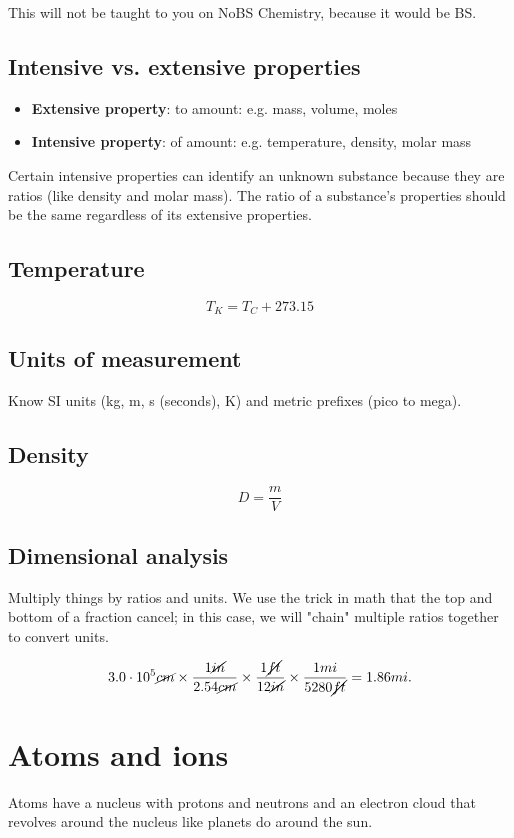 \documentclass[letterpaper, 12pt]{article}
\begin{document}
This will not be taught to you on NoBS Chemistry, because it would be BS.

	\subsection{Intensive vs. extensive properties}
	\begin{itemize}
		\item \textbf{Extensive property}:  to amount: e.g. mass, volume, moles
		\item \textbf{Intensive property}:  of amount: e.g. temperature, density, molar mass
	\end{itemize}

	Certain intensive properties can identify an unknown substance because they are ratios (like density and molar mass). The ratio of a substance's properties should be the same regardless of its extensive properties.

	\subsection{Temperature}
	$$T_{K} = T_{C} + 273.15$$

	\subsection{Units of measurement}
	Know SI units (kg, m, s (seconds), K) and metric prefixes (pico to mega).

	\subsection{Density}
	$$D = \frac{m}{V}$$

	\subsection{Dimensional analysis}
	Multiply things by ratios and units. We use the trick in math that the top and bottom of a fraction cancel; in this case, we will "chain" multiple ratios together to convert units.

	$$3.0 \cdot 10^5 \cancel{cm} \times \frac{1 \cancel{in}}{2.54 \cancel{cm}} \times \frac{1 \cancel{ft}}{12 \cancel{in}} \times \frac{1 mi}{5280 \cancel{ft}} = 1.86 mi.$$

\section{Atoms and ions}
Atoms have a nucleus with protons and neutrons and an electron cloud that revolves around the nucleus like planets do around the sun.
\end{document}
